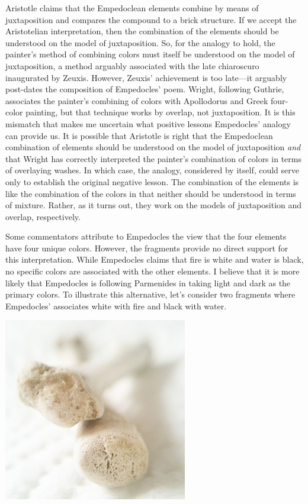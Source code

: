 Aristotle claims that the Empedoclean elements combine by means of juxtaposition and compares the compound to a brick structure. If we accept the Aristotelian interpretation, then the combination of the elements should be understood on the model of juxtaposition. So, for the analogy to hold, the painter's method of combining colors must itself be understood on the model of juxtaposition, a method arguably associated with the late chiaroscuro inaugurated by Zeuxis. However, Zeuxis' achievement is too late---it arguably post-dates the composition of Empedocles' poem. Wright, following Guthrie, associates the painter's combining of colors with Apollodorus and Greek four-color painting, but that technique works by overlap, not juxtaposition. It is this mismatch that makes me uncertain what positive lessons Empedocles' analogy can provide us. It is possible that Aristotle is right that the Empedoclean combination of elements should be understood on the model of juxtaposition \emph{and} that Wright has correctly interpreted the painter's combination of colors in terms of overlaying washes. In which case, the analogy, considered by itself, could serve only to establish the original negative lesson. The combination of the elements is like the combination of the colors in that neither should be understood in terms of mixture. Rather, as it turns out, they work on the models of juxtaposition and overlap, respectively.

Some commentators attribute to Empedocles the view that the four elements have four unique colors. However, the fragments provide no direct support for this interpretation. While Empedocles claims that fire is white and water is black, no specific colors are associated with the other elements. I believe that it is more likely that Empedocles is following Parmenides in taking light and dark as the primary colors. To illustrate this alternative, let's consider two fragments where Empedocles' associates white with fire and black with water. \change

\begin{frame}
	\begin{center}
		\includegraphics[height=8cm]{../../graphics/bone.jpg}
	\end{center}
\end{frame}

